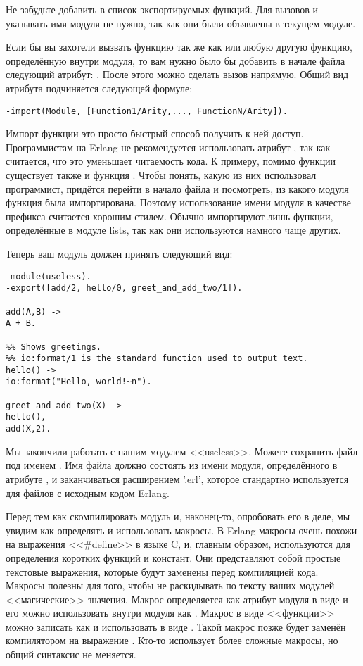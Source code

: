 Не забудьте добавить в список экспортируемых функций.
Для вызовов  и  указывать имя модуля не нужно, так как они были объявлены в текущем модуле.

Если бы вы захотели вызвать функцию  так же как  или любую другую функцию, определённую внутри модуля, то вам нужно было бы добавить в начале файла следующий атрибут: .
После этого можно сделать вызов  напрямую.
Общий вид атрибута  подчиняется следующей формуле:
\begin{lstlisting}[style=erlang]
-import(Module, [Function1/Arity,..., FunctionN/Arity]).
\end{lstlisting}

Импорт функции это просто быстрый способ получить к ней доступ.
Программистам на Erlang не рекомендуется использовать атрибут , так как считается, что это уменьшает читаемость кода.
К примеру, помимо функции  существует также и функция .
Чтобы понять, какую из них использовал программист, придётся перейти в начало файла и посмотреть, из какого модуля функция была импортирована.
Поэтому использование имени модуля в качестве префикса считается хорошим стилем.
Обычно импортируют лишь функции, определённые в модуле lists, так как они используются намного чаще других.

Теперь ваш модуль  должен принять следующий вид:
\begin{lstlisting}[style=erlang]
-module(useless).
-export([add/2, hello/0, greet_and_add_two/1]).
 
add(A,B) ->
A + B.
 
%% Shows greetings.
%% io:format/1 is the standard function used to output text.
hello() ->
io:format("Hello, world!~n").
 
greet_and_add_two(X) ->
hello(),
add(X,2).
\end{lstlisting}

Мы закончили работать с нашим модулем <<useless>>.
Можете сохранить файл под именем .
Имя файла должно состоять из имени модуля, определённого в атрибуте , и заканчиваться расширением '.erl', которое стандартно используется для файлов с исходным кодом Erlang.

Перед тем как скомпилировать модуль и, наконец\--то, опробовать его в деле, мы увидим как определять и использовать макросы.
В Erlang макросы очень похожи на выражения <<\#define>> в языке C, и, главным образом, используются для определения коротких функций и констант.
Они представляют собой простые текстовые выражения, которые будут заменены перед компиляцией кода.
Макросы полезны для того, чтобы не раскидывать по тексту ваших модулей <<магические>> значения.
Макрос определяется как атрибут модуля в виде  и его можно использовать внутри модуля как .
Макрос в виде <<функции>> можно записать как  и использовать в виде .
Такой макрос позже будет заменён компилятором на выражение .
Кто\--то использует более сложные макросы, но общий синтаксис не меняется.
